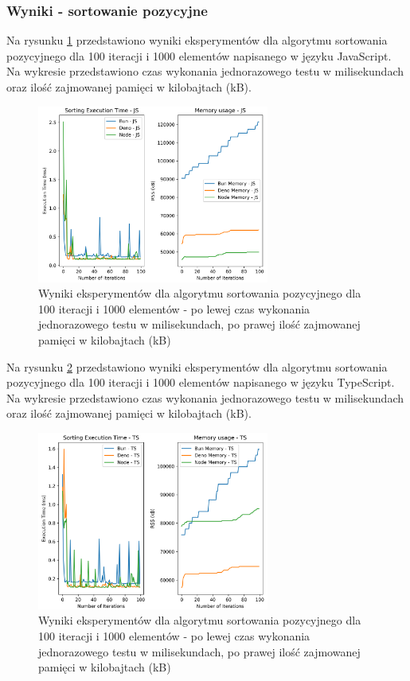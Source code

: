 \subsubsection{Wyniki - sortowanie pozycyjne}
Na rysunku \ref{fig:radix_sorting_e1} przedstawiono wyniki eksperymentów dla algorytmu sortowania pozycyjnego dla 100 iteracji i 1000 elementów napisanego w języku JavaScript. Na wykresie przedstawiono czas wykonania jednorazowego testu w milisekundach oraz ilość zajmowanej pamięci w kilobajtach (kB).

\begin{figure}[H]
  \centering
  \includegraphics[width=0.68\textwidth]{Figures/sorting/sorting_radix_100_1000_js.png}
  \caption{Wyniki eksperymentów dla algorytmu sortowania pozycyjnego dla 100 iteracji i 1000 elementów - po lewej czas wykonania jednorazowego testu w milisekundach, po prawej ilość zajmowanej pamięci w kilobajtach (kB)}
  \label{fig:radix_sorting_e1}
\end{figure}

Na rysunku \ref{fig:radix_sorting_e1_ts} przedstawiono wyniki eksperymentów dla algorytmu sortowania pozycyjnego dla 100 iteracji i 1000 elementów napisanego w języku TypeScript. Na wykresie przedstawiono czas wykonania jednorazowego testu w milisekundach oraz ilość zajmowanej pamięci w kilobajtach (kB).

\begin{figure}[H]
  \centering
  \includegraphics[width=0.68\textwidth]{Figures/sorting/sorting_radix_100_1000_ts.png}
  \caption{Wyniki eksperymentów dla algorytmu sortowania pozycyjnego dla 100 iteracji i 1000 elementów - po lewej czas wykonania jednorazowego testu w milisekundach, po prawej ilość zajmowanej pamięci w kilobajtach (kB)}
  \label{fig:radix_sorting_e1_ts}
\end{figure}


